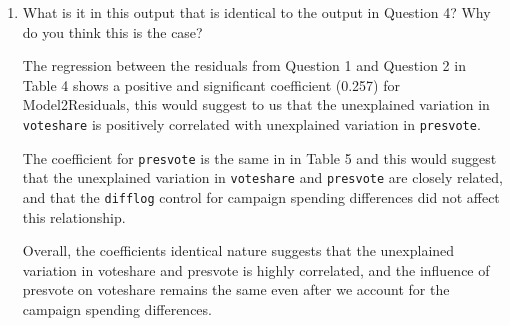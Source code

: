\documentclass[12pt,letterpaper]{article}
\begin{document}
\begin{enumerate}
		\item What is it in this output that is identical to the output in Question 4? Why do you think this is the case?
		
		
		The regression between the residuals from Question 1 and Question 2 in Table 4 shows a positive and significant coefficient (0.257) for Model2Residuals, this would suggest to us that the unexplained variation in \texttt{voteshare} is positively correlated with unexplained variation in \texttt{presvote}.  
		
		The coefficient for \texttt{presvote} is the same in in Table 5 and this would suggest that the unexplained variation in \texttt{voteshare} and \texttt{presvote} are closely related, and that the \texttt{difflog} control for campaign spending differences did not affect this relationship.
	
		Overall, the coefficients identical nature suggests that the unexplained variation in voteshare and presvote is highly correlated, and the influence of presvote on voteshare remains the same even after we account for the campaign spending differences.
		
	\end{enumerate}
\end{document}
